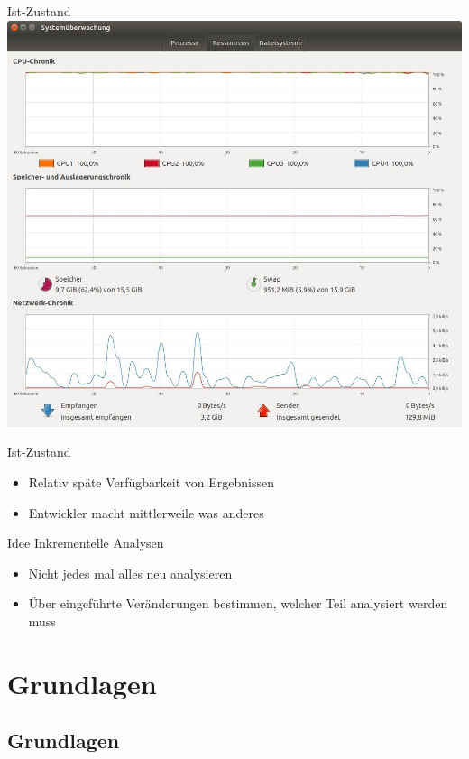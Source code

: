 \documentclass[compress, aspectratio=43, noserifmath]{beamer}
\begin{document}
\begin{frame}{Ist-Zustand}
\includegraphics[width=1\textwidth]{image/cpu-analysis.jpg}
\end{frame}

\begin{frame}{Ist-Zustand}
\begin{itemize}
    \item[\textbullet] Relativ sp\"ate Verf\"ugbarkeit von Ergebnissen
    \item[\textbullet] Entwickler macht mittlerweile was anderes
\end{itemize}
\end{frame}

\begin{frame}{Idee}
Inkrementelle Analysen
\begin{itemize}
    \item[\textbullet] Nicht jedes mal alles neu analysieren
    \item[\textbullet] \"Uber eingef\"uhrte Ver\"anderungen bestimmen, welcher Teil analysiert werden muss 
\end{itemize}
\end{frame}



\section{Grundlagen}
\subsection{Grundlagen}
\end{document}
